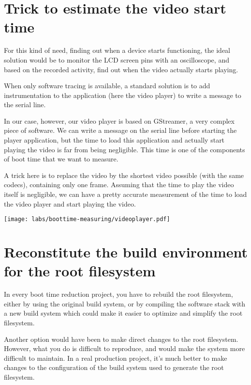 \section{Trick to estimate the video start time} 

For this kind of need, finding out when a device starts functioning, 
the ideal solution would be to monitor the LCD screen pins with an
oscilloscope, and based on the recorded activity, find out when the 
video actually starts playing.

When only software tracing is available, a standard solution is to
add instrumentation to the application (here the video player) to write a message to 
the serial line.

In our case, however, our video player is based on GStreamer, a very
complex piece of software. We can write a message on the serial line
before starting the player application, but the time to load this
application and actually start playing the video is far from being
negligible. This time is one of the components of boot time that we want to
measure. 

A trick here is to replace the video by the shortest video possible
(with the same codecs), containing only one frame. Assuming that
the time to play the video itself is negligible, we can have a pretty
accurate measurement of the time to load the video player and start
playing the video.

\begin{center}
\texttt{[image: labs/boottime-measuring/videoplayer.pdf]}
\end{center}

\section{Reconstitute the build environment for the root filesystem}

In every boot time reduction project, you have to rebuild the root
filesystem, either by using the original build system, or by compiling
the software stack with a new build system which could make it
easier to optimize and simplify the root filesystem.

Another option would have been to make direct changes to the root
filesystem. However, what you do is difficult to reproduce, and would
make the system more difficult to maintain. In a real production
project, it's much better to make changes to the configuration of
the build system used to generate the root filesystem.

